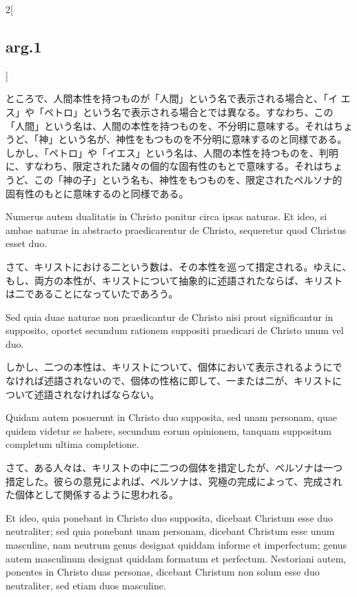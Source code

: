 \documentclass[paper=a4paper,fontsize=10pt,jafontsize=9pt,titlepage]{jlreq}
\begin{document}
\begin{paracol}{2}[\subsection{arg.1}]
\switchcolumn

ところで、人間本性を持つものが「人間」という名で表示される場合と、「イ
エス」や「ペトロ」という名で表示される場合とでは異なる。すなわち、この
「人間」という名は、人間の本性を持つものを、不分明に意味する。それはちょ
うど、「神」という名が、神性をもつものを不分明に意味するのと同様である。
しかし、「ペトロ」や「イエス」という名は、人間の本性を持つものを、判明
に、すなわち、限定された諸々の個的な固有性のもとで意味する。それはちょ
うど、この「神の子」という名も、神性をもつものを、限定されたペルソナ的
固有性のもとに意味するのと同様である。

\switchcolumn*

Numerus autem
 dualitatis in Christo ponitur circa ipsas naturas. Et ideo, si ambae
 naturae in abstracto praedicarentur de Christo, sequeretur quod
 Christus esset duo.

\switchcolumn

さて、キリストにおける二という数は、その本性を巡って措定される。ゆえに、
もし、両方の本性が、キリストについて抽象的に述語されたならば、キリスト
は二であることになっていたであろう。

\switchcolumn*

Sed quia duae naturae non praedicantur de Christo
 nisi prout significantur in supposito, oportet secundum rationem
 suppositi praedicari de Christo unum vel duo.

\switchcolumn

しかし、二つの本性は、キリストについて、個体において表示されるようにで
なければ述語されないので、個体の性格に即して、一または二が、キリストに
ついて述語されなければならない。

\switchcolumn*

Quidam autem posuerunt in
 Christo duo supposita, sed unam personam, quae quidem videtur se
 habere, secundum eorum opinionem, tanquam suppositum completum ultima
 completione.

\switchcolumn

さて、ある人々は、キリストの中に二つの個体を措定したが、ペルソナは一つ
措定した。彼らの意見によれば、ペルソナは、究極の完成によって、完成され
た個体として関係するように思われる。

\switchcolumn*

Et ideo, quia ponebant in Christo duo supposita, dicebant Christum
esse duo neutraliter; sed quia ponebant unam personam, dicebant
Christum esse unum masculine, nam neutrum genus designat quiddam
informe et imperfectum; genus autem masculinum designat quiddam
formatum et perfectum. Nestoriani autem, ponentes in Christo duas
personas, dicebant Christum non solum esse duo neutraliter, sed etiam
duos masculine.


\end{paracol}
\end{document}
